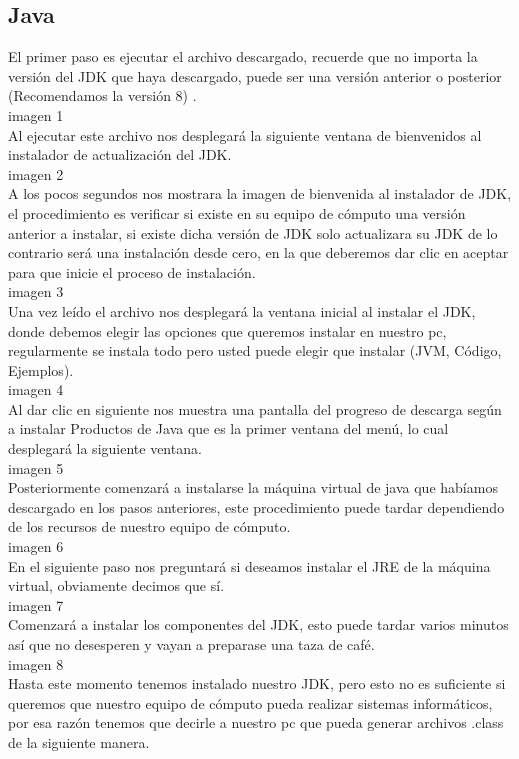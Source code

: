 \subsection{Java}  
El primer paso es ejecutar el archivo descargado, recuerde que no importa la versión del JDK que haya descargado, puede ser una versión anterior o posterior (Recomendamos la versión 8) .\\
	imagen 1\\
Al ejecutar este archivo nos desplegará la siguiente ventana de bienvenidos al instalador de actualización del JDK.\\
	imagen 2\\
A los pocos segundos nos mostrara la imagen de bienvenida al instalador de JDK, el procedimiento es verificar si existe en su equipo de cómputo una versión anterior a instalar, si existe dicha versión de JDK solo actualizara su JDK de lo contrario será una instalación desde cero, en la que deberemos dar clic en aceptar para que inicie el proceso de instalación.\\
	imagen 3\\
Una vez leído el archivo nos desplegará la ventana inicial al instalar el JDK, donde debemos elegir las opciones que queremos instalar en nuestro pc, regularmente se instala todo pero usted puede elegir que instalar (JVM, Código, Ejemplos).\\
	imagen 4\\
Al dar clic en siguiente nos muestra una pantalla del progreso de descarga según a instalar Productos de Java que es la primer ventana del menú, lo cual desplegará la siguiente ventana.\\
	imagen 5\\
Posteriormente comenzará a instalarse la máquina virtual de java que habíamos descargado en los pasos anteriores, este procedimiento puede tardar dependiendo de los recursos de nuestro equipo de cómputo.\\
	imagen 6\\
En el siguiente paso nos preguntará si deseamos instalar el JRE de la máquina virtual, obviamente decimos que sí.\\
	imagen 7\\
Comenzará a instalar los componentes del JDK, esto puede tardar varios minutos así que no desesperen y vayan a preparase una taza de café.\\
	imagen 8\\
Hasta este momento tenemos instalado nuestro JDK, pero esto no es suficiente si queremos que nuestro equipo de cómputo pueda realizar sistemas informáticos, por esa razón tenemos que decirle a nuestro pc que pueda generar archivos .class de la siguiente manera.
